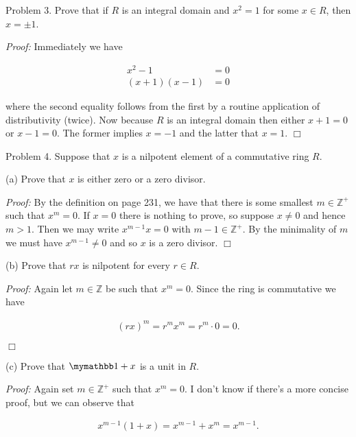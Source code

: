 \documentclass{article}
\begin{document}
  \pagebreak

  {\Large \color{Sepia} Problem 3.  Prove that if $R$ is an integral domain and $x^2= 1$ for some $x\in R$, then $x=\pm1$.}

  {\it Proof:} Immediately we have

  \begin{align*}
    x^2 - 1 &= 0\\
    (x+1)(x-1) &= 0
  \end{align*}

  where the second equality follows from the first by a routine application of distributivity (twice).  Now because $R$ is an integral domain then either $x+1=0$ or $x-1=0$.  The former implies $x=-1$ and the latter that $x=1$.  $\Box$

  \pagebreak

  {\Large \color{Sepia} Problem 4.  Suppose that $x$ is a nilpotent element of a commutative ring $R$.

  (a)  Prove that $x$ is either zero or a zero divisor.}

  {\it Proof:} By the definition on page 231, we have that there is some smallest $m\in \mathbb Z^+$ such that $x^m = 0$.  If $x=0$ there is nothing to prove, so suppose $x\ne 0$ and hence $m>1$.  Then we may write $x^{m-1}x = 0$ with $m-1\in\mathbb Z^+$.  By the minimality of $m$ we must have $x^{m-1}\ne 0$ and so $x$ is a zero divisor.  $\Box$

  \vspace{1cm}

  {\Large \color{Sepia} (b)  Prove that $rx$ is nilpotent for every $r\in R$.}

  {\it Proof:} Again let $m\in \mathbb Z$ be such that $x^m=0$.  Since the ring is commutative we have

  \begin{align*}
    (rx)^m = r^m x^m = r^m \cdot 0 = 0.
  \end{align*}

  $\Box$

  \vspace{1cm}

  {\Large \color{Sepia} (c)  Prove that $\mymathbb 1 +x$ is a unit in $R$.}

  {\it Proof:} Again set $m\in\mathbb Z^+$ such that $x^m = 0$.  I don't know if there's a more concise proof, but we can observe that

  \begin{align*}
    x^{m-1}(1+x) = x^{m-1}+x^m=x^{m-1}.
  \end{align*}
\end{document}
